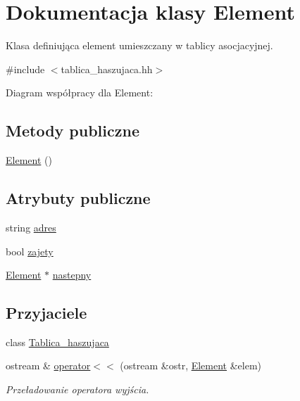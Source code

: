 \hypertarget{class_element}{\section{\-Dokumentacja klasy \-Element}
\label{class_element}
}


\-Klasa definiująca element umieszczany w tablicy asocjacyjnej.  




{\ttfamily \#include $<$tablica\-\_\-haszujaca.\-hh$>$}



\-Diagram współpracy dla \-Element\-:
\subsection*{\-Metody publiczne}
\begin{DoxyCompactItemize}
\item 
\hyperlink{class_element_ab0d0e20be9a36ae676202db753faeec9}{\-Element} ()
\end{DoxyCompactItemize}
\subsection*{\-Atrybuty publiczne}
\begin{DoxyCompactItemize}
\item 
string \hyperlink{class_element_a3c69cfe4adca29bca0ca6eac06298366}{adres}
\item 
bool \hyperlink{class_element_ae689c2af2c94f3b9fb1c07e89358b3a0}{zajety}
\item 
\hyperlink{class_element}{\-Element} $\ast$ \hyperlink{class_element_a04ef972f58a1777f38b54df88df2fc12}{nastepny}
\end{DoxyCompactItemize}
\subsection*{\-Przyjaciele}
\begin{DoxyCompactItemize}
\item 
class \hyperlink{class_element_a7ea87400dc1aab2d9cdf44457d24cd2a}{\-Tablica\-\_\-haszujaca}
\item 
ostream \& \hyperlink{class_element_a5fbcf8eef969e643764a485bc6f3a100}{operator$<$$<$} (ostream \&ostr, \hyperlink{class_element}{\-Element} \&elem)
\begin{DoxyCompactList}\small\item\em \-Przeładowanie operatora wyjścia. \end{DoxyCompactList}\end{DoxyCompactItemize}


